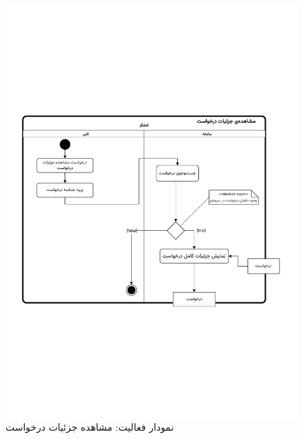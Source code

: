 \begin{figure}[ht!]
	\centering
	\includegraphics[scale=0.8, page=1]{figs/OOD-activity-detailreq.pdf}
	\caption{نمودار فعالیت: مشاهده جزئیات درخواست}
\end{figure}
\FloatBarrier
\newpage

